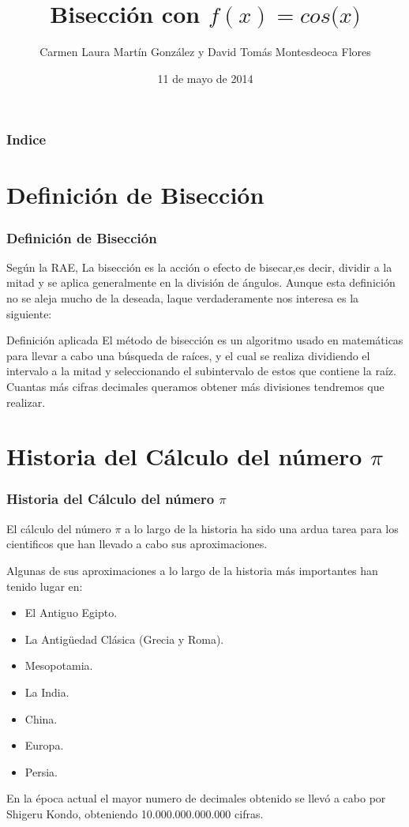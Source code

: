 \documentclass{beamer}
\title[La bisección de $f(x)=cos($\pi$x)$ en \textsc{Beamer}]{Bisección con $f(x)=cos($\pi$x)$}
\author[D. Montesdeoca y  L. Martín]{Carmen Laura Martín González
y
David Tomás Montesdeoca Flores}
\date[11/05/14]{11 de mayo de 2014}
\begin{document}
\begin{frame}
\titlepage
\end{frame}

\begin{frame}
\frametitle{Indice}
\tableofcontents[pausesections]

\end{frame}

\section{Definición de Bisección}

\begin{frame}
\frametitle{Definición de Bisección}

Según la RAE, La bisección es la acción o efecto de bisecar,es decir, dividir a la mitad y se aplica generalmente en la división de ángulos. Aunque esta definición no se aleja mucho de la deseada, laque verdaderamente nos interesa es la siguiente:

\begin{block}{Definición aplicada}
El método de bisección es un algoritmo usado en matemáticas para llevar a cabo una búsqueda de raíces, y el cual se realiza dividiendo el intervalo a la mitad y seleccionando el subintervalo de estos que contiene la raíz. Cuantas más cifras decimales queramos obtener más divisiones tendremos que realizar.
\end{block} 

\end{frame}

\section{Historia del Cálculo del número $\pi$}

\begin{frame}
\frametitle{Historia del Cálculo del número $\pi$}
El cálculo del número $\pi$ a lo largo de la historia ha sido una ardua tarea para los cientificos que han llevado a cabo sus aproximaciones.

Algunas de sus aproximaciones a lo largo de la historia más importantes han tenido lugar en:

\begin{itemize}
  \item El Antiguo Egipto.
  \pause
  \item La Antigüedad Clásica (Grecia y Roma).
  \pause
  \item Mesopotamia.
  \pause
  \item La India.
  \pause
  \item China.
  \pause
  \item Europa.
  \pause
  \item Persia.
  \pause
\end{itemize}

En la época actual el mayor numero de decimales obtenido se llevó  a cabo por Shigeru Kondo, obteniendo 10.000.000.000.000 cifras.

\end{frame}
\end{document}
